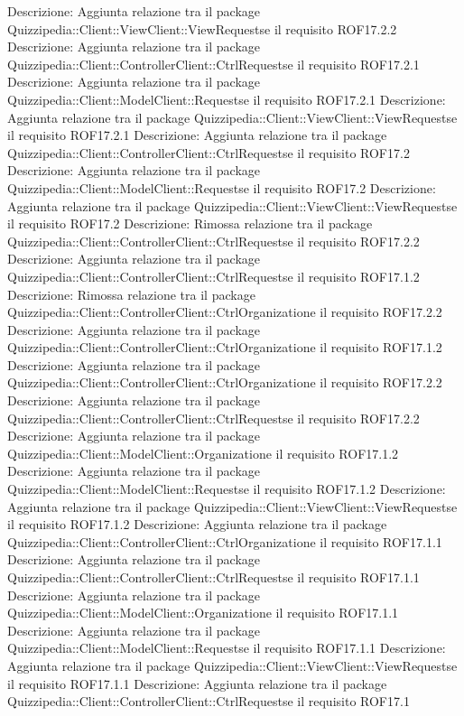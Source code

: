 Descrizione: Aggiunta relazione tra il package Quizzipedia::Client::ViewClient::ViewRequestse il requisito ROF17.2.2 
Descrizione: Aggiunta relazione tra il package Quizzipedia::Client::ControllerClient::CtrlRequestse il requisito ROF17.2.1 
Descrizione: Aggiunta relazione tra il package Quizzipedia::Client::ModelClient::Requestse il requisito ROF17.2.1 
Descrizione: Aggiunta relazione tra il package Quizzipedia::Client::ViewClient::ViewRequestse il requisito ROF17.2.1 
Descrizione: Aggiunta relazione tra il package Quizzipedia::Client::ControllerClient::CtrlRequestse il requisito ROF17.2 
Descrizione: Aggiunta relazione tra il package Quizzipedia::Client::ModelClient::Requestse il requisito ROF17.2 
Descrizione: Aggiunta relazione tra il package Quizzipedia::Client::ViewClient::ViewRequestse il requisito ROF17.2 
Descrizione: Rimossa relazione tra il package Quizzipedia::Client::ControllerClient::CtrlRequestse il requisito ROF17.2.2 
Descrizione: Aggiunta relazione tra il package Quizzipedia::Client::ControllerClient::CtrlRequestse il requisito ROF17.1.2 
Descrizione: Rimossa relazione tra il package Quizzipedia::Client::ControllerClient::CtrlOrganizatione il requisito ROF17.2.2 
Descrizione: Aggiunta relazione tra il package Quizzipedia::Client::ControllerClient::CtrlOrganizatione il requisito ROF17.1.2 
Descrizione: Aggiunta relazione tra il package Quizzipedia::Client::ControllerClient::CtrlOrganizatione il requisito ROF17.2.2 
Descrizione: Aggiunta relazione tra il package Quizzipedia::Client::ControllerClient::CtrlRequestse il requisito ROF17.2.2 
Descrizione: Aggiunta relazione tra il package Quizzipedia::Client::ModelClient::Organizatione il requisito ROF17.1.2 
Descrizione: Aggiunta relazione tra il package Quizzipedia::Client::ModelClient::Requestse il requisito ROF17.1.2 
Descrizione: Aggiunta relazione tra il package Quizzipedia::Client::ViewClient::ViewRequestse il requisito ROF17.1.2 
Descrizione: Aggiunta relazione tra il package Quizzipedia::Client::ControllerClient::CtrlOrganizatione il requisito ROF17.1.1 
Descrizione: Aggiunta relazione tra il package Quizzipedia::Client::ControllerClient::CtrlRequestse il requisito ROF17.1.1 
Descrizione: Aggiunta relazione tra il package Quizzipedia::Client::ModelClient::Organizatione il requisito ROF17.1.1 
Descrizione: Aggiunta relazione tra il package Quizzipedia::Client::ModelClient::Requestse il requisito ROF17.1.1 
Descrizione: Aggiunta relazione tra il package Quizzipedia::Client::ViewClient::ViewRequestse il requisito ROF17.1.1 
Descrizione: Aggiunta relazione tra il package Quizzipedia::Client::ControllerClient::CtrlRequestse il requisito ROF17.1 
